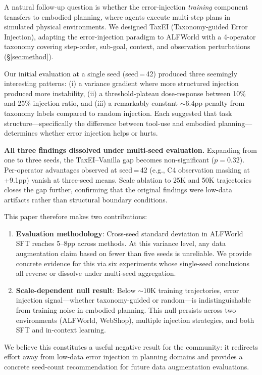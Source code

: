 \documentclass[11pt,a4paper]{article}
\begin{document}
A natural follow-up question is whether the error-injection \emph{training} component transfers to embodied planning, where agents execute multi-step plans in simulated physical environments.
We designed TaxEI (Taxonomy-guided Error Injection), adapting the error-injection paradigm to ALFWorld with a 4-operator taxonomy covering step-order, sub-goal, context, and observation perturbations (\S\ref{sec:method}).

Our initial evaluation at a single seed (seed\,=\,42) produced three seemingly interesting patterns: (i) a variance gradient where more structured injection produced more instability, (ii) a threshold-plateau dose-response between 10\% and 25\% injection ratio, and (iii) a remarkably constant ${\sim}6.4$pp penalty from taxonomy labels compared to random injection.
Each suggested that task structure---specifically the difference between tool-use and embodied planning---determines whether error injection helps or hurts.

\textbf{All three findings dissolved under multi-seed evaluation.}
Expanding from one to three seeds, the TaxEI--Vanilla gap becomes non-significant ($p{=}0.32$).
Per-operator advantages observed at seed\,=\,42 (e.g., C4 observation masking at +9.1pp) vanish at three-seed means.
Scale ablation to 25K and 50K trajectories closes the gap further, confirming that the original findings were low-data artifacts rather than structural boundary conditions.

This paper therefore makes two contributions:

\begin{enumerate}
\item \textbf{Evaluation methodology}: Cross-seed standard deviation in ALFWorld SFT reaches 5--8pp across methods.
  At this variance level, any data augmentation claim based on fewer than five seeds is unreliable.
  We provide concrete evidence for this via six experiments whose single-seed conclusions all reverse or dissolve under multi-seed aggregation.

\item \textbf{Scale-dependent null result}: Below ${\sim}10$K training trajectories, error injection signal---whether taxonomy-guided or random---is indistinguishable from training noise in embodied planning.
  This null persists across two environments (ALFWorld, WebShop), multiple injection strategies, and both SFT and in-context learning.
\end{enumerate}

We believe this constitutes a useful negative result for the community: it redirects effort away from low-data error injection in planning domains and provides a concrete seed-count recommendation for future data augmentation evaluations.
\end{document}
